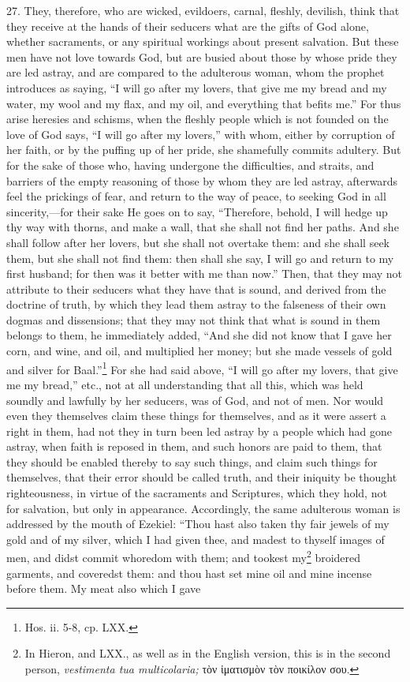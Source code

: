 27. They, therefore, who are wicked, evildoers, carnal, fleshly, devilish, think that they receive at the hands of their seducers what are the gifts of God alone, whether sacraments, or any spiritual workings about present salvation. But these men have not love towards God, but are busied about those by whose pride they are led astray, and are compared to the adulterous woman, whom the prophet introduces as saying, ``I will go after my lovers, that give me my bread and my water, my wool and my flax, and my oil, and everything that befits me.'' For thus arise heresies and schisms, when the fleshly people which is not founded on the love of God says, ``I will go after my lovers,'' with whom, either by corruption of her faith, or by the puffing up of her pride, she shamefully commits adultery. But for the sake of those who, having undergone the difficulties, and straits, and barriers of the empty reasoning of those by whom they are led astray, afterwards feel the prickings of fear, and return to the way of peace, to seeking God in all sincerity,—for their sake He goes on to say, ``Therefore, behold, I will hedge up thy way with thorns, and make a wall, that she shall not find her paths. And she shall follow after her lovers, but she shall not overtake them: and she shall seek them, but she shall not find them: then shall she say, I will go and return to my first husband; for then was it better with me than now.'' Then, that they may not attribute to their seducers what they have that is sound, and derived from the doctrine of truth, by which they lead them astray to the falseness of their own dogmas and dissensions; that they may not think that what is sound in them belongs to them, he immediately added, ``And she did not know that I gave her corn, and wine, and oil, and multiplied her money; but she made vessels of gold and silver for Baal.''\footnote{\par  Hos. ii. 5-8, cp. LXX.} For she had said above, ``I will go after my lovers, that give me my bread,'' etc., not at all understanding that all this, which was held soundly and lawfully by her seducers, was of God, and not of men. Nor would even they themselves claim these things for themselves, and as it were assert a right in them, had not they in turn been led astray by a people which had gone astray, when faith is reposed in them, and such honors are paid to them, that they should be enabled thereby to say such things, and claim such things for themselves, that their error should be called truth, and their iniquity be thought righteousness, in virtue of the sacraments and Scriptures, which they hold, not for salvation, but only in appearance. Accordingly, the same adulterous woman is addressed by the mouth of Ezekiel: ``Thou hast also taken thy fair jewels of my gold and of my silver, which I had given thee, and madest to thyself images of men, and didst commit whoredom with them; and tookest my\footnote{\par  In Hieron, and LXX., as well as in the English version, this is in the second person, \emph{vestimenta tua multicolaria;} \textgreek{τὸν ἱματισμὸν τὸν ποικίλον σου}.} broidered garments, and coveredst them: and thou hast set mine oil and mine incense before them. My meat also which I gave 